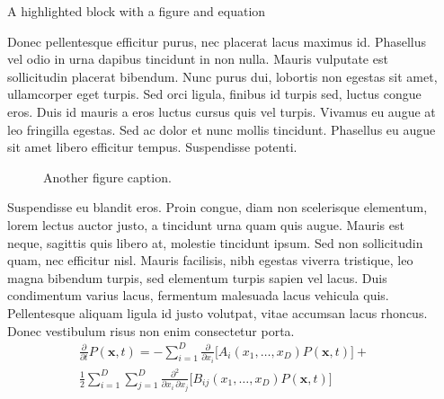 \documentclass[final]{beamer}
\newlength{\sepwidth}
\newlength{\colwidth}
\newcommand{\separatorcolumn}{\begin{column}{\sepwidth}\end{column}}
\begin{document}
\begin{frame}[t]
\begin{columns}[t]
\separatorcolumn


\begin{column}{\colwidth}
    \begin{alertblock}{A highlighted block with a figure and equation}

   Donec pellentesque efficitur purus, nec placerat lacus maximus id. Phasellus vel odio in urna dapibus tincidunt in non nulla. Mauris vulputate est sollicitudin placerat bibendum. Nunc purus dui, lobortis non egestas sit amet, ullamcorper eget turpis. Sed orci ligula, finibus id turpis sed, luctus congue eros. Duis id mauris a eros luctus cursus quis vel turpis. Vivamus eu augue at leo fringilla egestas. Sed ac dolor et nunc mollis tincidunt. Phasellus eu augue sit amet libero efficitur tempus. Suspendisse potenti. 
    \begin{figure}
      \centering
      \caption{Another figure caption.}
    \end{figure}
    
Suspendisse eu blandit eros. Proin congue, diam non scelerisque elementum, lorem lectus auctor justo, a tincidunt urna quam quis augue. Mauris est neque, sagittis quis libero at, molestie tincidunt ipsum. Sed non sollicitudin quam, nec efficitur nisl. Mauris facilisis, nibh egestas viverra tristique, leo magna bibendum turpis, sed elementum turpis sapien vel lacus. Duis condimentum varius lacus, fermentum malesuada lacus vehicula quis. Pellentesque aliquam ligula id justo volutpat, vitae accumsan lacus rhoncus. Donec vestibulum risus non enim consectetur porta. 
\begin{align*}
    \frac{\partial}{\partial t} P(\mathbf{x},t) = -\sum_{i=1}^{D} \frac{\partial}{\partial x_i} \Big[ A_i(x_1, \ldots, x_D) P(\mathbf{x},t) \Big] + \\
    \frac{1}{2} \sum_{i=1}^{D} \sum_{j=1}^{D} \frac{\partial^2}{\partial x_i \, \partial x_j} \Big[ B_{ij}(x_1, \ldots, x_D) P(\mathbf{x},t) \Big]
\end{align*}
	

\end{alertblock}
\end{column}
\end{columns}
\end{frame}
\end{document}
